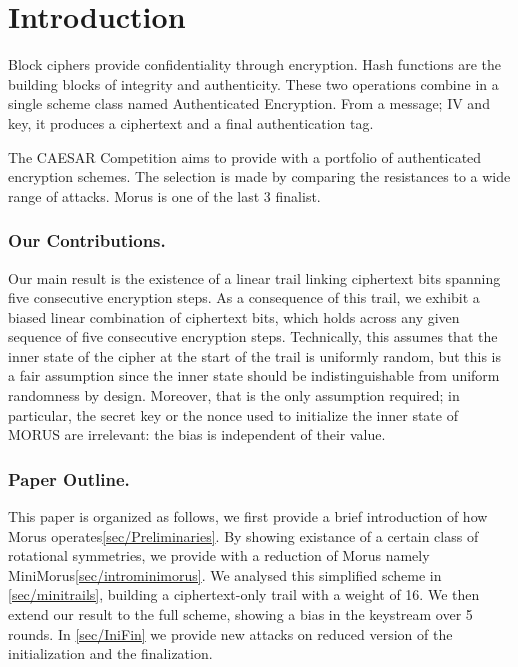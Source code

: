 \section{Introduction}
\label{sec/Introduction}

Block ciphers provide confidentiality through encryption. Hash functions are the building blocks of integrity and authenticity. These two operations combine in a single scheme class named Authenticated Encryption. From a message; IV and key, it produces a ciphertext and a final authentication tag.

\noindent
The CAESAR\cite{CAESAR} Competition aims to provide with a portfolio of authenticated encryption schemes. The selection is made by comparing the resistances to a wide range of attacks. Morus is one of the last 3 finalist.

\subsubsection*{Our Contributions.}
Our main result is the existence of a linear trail linking ciphertext bits spanning five consecutive encryption steps. As a consequence of this trail, we exhibit a biased linear combination of ciphertext bits, which holds across any given sequence of five consecutive encryption steps. Technically, this assumes that the inner state of the cipher at the start of the trail is uniformly random, but this is a fair assumption since the inner state should be indistinguishable from uniform randomness by design. Moreover, that is the only assumption required; in particular, the secret key or the nonce used to initialize the inner state of MORUS are irrelevant: the bias is independent of their value.

\subsubsection*{Paper Outline.}
This paper is organized as follows, we first provide a brief introduction of how Morus operates\ref{sec/Preliminaries}. By showing existance of a certain class of rotational symmetries, we provide with a reduction of Morus namely MiniMorus\ref{sec/introminimorus}. We analysed this simplified scheme in \ref{sec/minitrails}, building a ciphertext-only trail with a weight of 16.
We then extend our result to the full scheme, showing a bias in the keystream over 5 rounds. In \ref{sec/IniFin} we provide new attacks on reduced version of the initialization and the finalization.
